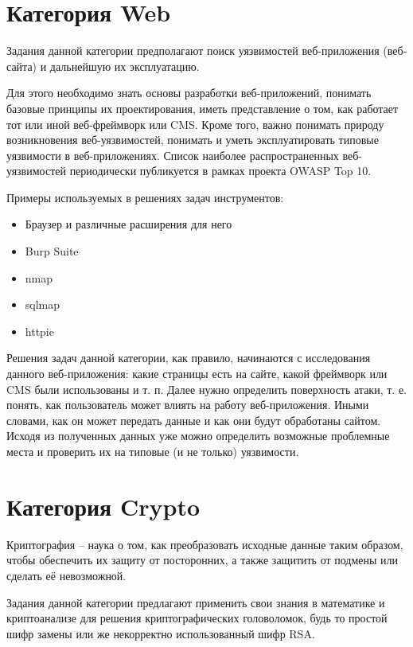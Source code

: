\section{Категория Web}

Задания данной категории предполагают поиск уязвимостей веб-приложения (веб-сайта) и дальнейшую их эксплуатацию.

Для этого необходимо знать основы разработки веб-приложений, понимать базовые принципы их проектирования, иметь представление о том, как работает тот или иной веб-фреймворк или CMS. Кроме того, важно понимать природу возникновения веб-уязвимостей, понимать и уметь эксплуатировать типовые уязвимости в веб-приложениях. Список наиболее распространенных веб-уязвимостей периодически публикуется в рамках проекта OWASP Top 10.

Примеры используемых в решениях задач инструментов:
\begin{itemize}
    \item Браузер и различные расширения для него
    \item Burp Suite
    \item nmap
    \item sqlmap
    \item httpie
\end{itemize}

Решения задач данной категории, как правило, начинаются с исследования данного веб-приложения: какие страницы есть на сайте, какой фреймворк или CMS были использованы и т. п. Далее нужно определить поверхность атаки, т. е. понять, как пользователь может влиять на работу веб-приложения. Иными словами, как он может передать данные и как они будут обработаны сайтом. Исходя из полученных данных уже можно определить возможные проблемные места и проверить их на типовые (и не только) уязвимости.





\section{Категория Crypto}

Криптография – наука о том, как преобразовать исходные данные таким образом, чтобы обеспечить их защиту от посторонних, а также защитить от подмены или сделать её невозможной.

Задания данной категории предлагают применить свои знания в математике и криптоанализе для решения криптографических головоломок, будь то простой шифр замены или же некорректно использованный шифр RSA.

